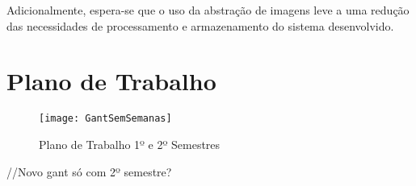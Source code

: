 Adicionalmente, espera-se que o uso da abstração de imagens leve a uma redução das necessidades de processamento e armazenamento do sistema desenvolvido.

\section{Plano de Trabalho}

\begin{figure}[t]
  \begin{center}
    \leavevmode
    \texttt{[image: GantSemSemanas]}
    \caption{Plano de Trabalho 1º e 2º Semestres}	
    \label{fig:planotrabalho}
  \end{center}
\end{figure}

//Novo gant só com 2º semestre?

